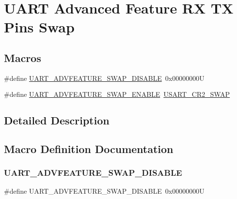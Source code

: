 \hypertarget{group___u_a_r_t___rx___tx___swap}{}\section{U\+A\+RT Advanced Feature RX TX Pins Swap}
\label{group___u_a_r_t___rx___tx___swap}
\subsection*{Macros}
\begin{DoxyCompactItemize}
\item 
\#define \mbox{\hyperlink{group___u_a_r_t___rx___tx___swap_gad1217ff59732b36d4ee9b50e7ed81ec4}{U\+A\+R\+T\+\_\+\+A\+D\+V\+F\+E\+A\+T\+U\+R\+E\+\_\+\+S\+W\+A\+P\+\_\+\+D\+I\+S\+A\+B\+LE}}~0x00000000U
\item 
\#define \mbox{\hyperlink{group___u_a_r_t___rx___tx___swap_ga83138521e54eef41c75e9c37c2246eba}{U\+A\+R\+T\+\_\+\+A\+D\+V\+F\+E\+A\+T\+U\+R\+E\+\_\+\+S\+W\+A\+P\+\_\+\+E\+N\+A\+B\+LE}}~\mbox{\hyperlink{group___peripheral___registers___bits___definition_ga4aecba5721df1c1adb6d0264625accad}{U\+S\+A\+R\+T\+\_\+\+C\+R2\+\_\+\+S\+W\+AP}}
\end{DoxyCompactItemize}


\subsection{Detailed Description}


\subsection{Macro Definition Documentation}
\mbox{\label{group___u_a_r_t___rx___tx___swap_gad1217ff59732b36d4ee9b50e7ed81ec4}} 
\subsubsection{\texorpdfstring{UART\_ADVFEATURE\_SWAP\_DISABLE}{UART\_ADVFEATURE\_SWAP\_DISABLE}}
{\footnotesize\ttfamily \#define U\+A\+R\+T\+\_\+\+A\+D\+V\+F\+E\+A\+T\+U\+R\+E\+\_\+\+S\+W\+A\+P\+\_\+\+D\+I\+S\+A\+B\+LE~0x00000000U}

